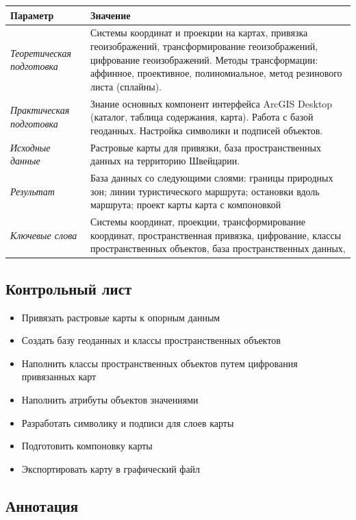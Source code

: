 \documentclass[]{book}
\providecommand{\tightlist}{%
  \setlength{\itemsep}{0pt}\setlength{\parskip}{0pt}}
\theoremstyle{definition}
\theoremstyle{definition}
\theoremstyle{definition}
\theoremstyle{remark}
\begin{document}
\begin{longtable}[]{@{}ll@{}}
\toprule
Параметр & Значение\tabularnewline
\midrule
\endhead
\emph{Теоретическая подготовка} & Системы координат и проекции на
картах, привязка геоизображений, трансформирование геоизображений,
цифрование геоизображений. Методы трансформации: аффинное, проективное,
полиномиальное, метод резинового листа (сплайны).\tabularnewline
\emph{Практическая подготовка} & Знание основных компонент интерфейса
ArcGIS Desktop (каталог, таблица содержания, карта). Работа с базой
геоданных. Настройка символики и подписей объектов.\tabularnewline
\emph{Исходные данные} & Растровые карты для привязки, база
пространственных данных на территорию Швейцарии.\tabularnewline
\emph{Результат} & База данных со следующими слоями: границы природных
зон; линии туристического маршрута; остановки вдоль маршрута; проект
карты карта с компоновкой\tabularnewline
\emph{Ключевые слова} & Системы координат, проекции, трансформирование
координат, пространственная привязка, цифрование, классы
пространственных объектов, база пространственных данных,\tabularnewline
\bottomrule
\end{longtable}

\hypertarget{map-ref-general-control}{%
\subsection{Контрольный лист}\label{map-ref-general-control}}

\begin{itemize}
\tightlist
\item
  Привязать растровые карты к опорным данным
\item
  Создать базу геоданных и классы пространственных объектов
\item
  Наполнить классы пространственных объектов путем цифрования
  привязанных карт
\item
  Наполнить атрибуты объектов значениями
\item
  Разработать символику и подписи для слоев карты
\item
  Подготовить компоновку карты
\item
  Экспортировать карту в графический файл
\end{itemize}

\hypertarget{map-ref-general-anno}{%
\subsection{Аннотация}\label{map-ref-general-anno}}
\end{document}

